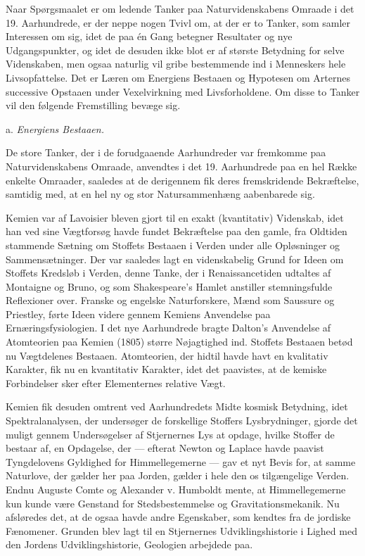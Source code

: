 \documentclass[12pt,a4paper,openany]{book}
\newcommand{\opage}[1]{\marginnote{\footnotesize\textit{[#1]}}}
\newcommand{\sectionhead}[2]{\par\bigskip\phantomsection\begin{center}#1 \textit{#2}\end{center}\addcontentsline{toc}{section}{#1 #2}\medskip\ignorespaces}
\begin{document}
Naar Spørgsmaalet er om ledende Tanker paa Naturvidenskabens
Omraade i det 19. Aarhundrede, er der neppe nogen Tvivl om, at
der er to Tanker, som samler Interessen om sig, idet de paa én
Gang betegner Resultater og nye Udgangspunkter, og idet de desuden
ikke blot er af største Betydning for selve Videnskaben, men
\opage{26}ogsaa naturlig vil gribe bestemmende ind i Menneskers hele Livsopfattelse.
Det er Læren om Energiens Bestaaen og Hypotesen om
Arternes successive Opstaaen under Vexelvirkning med Livsforholdene.
Om disse to Tanker vil den følgende Fremstilling bevæge sig.

\sectionhead{a.}{Energiens Bestaaen.}

De store Tanker, der i de forudgaaende Aarhundreder var fremkomme
paa Naturvidenskabens Omraade, anvendtes i det 19. Aarhundrede
paa en hel Række enkelte Omraader, saaledes at de derigennem
fik deres fremskridende Bekræftelse, samtidig med, at en
hel ny og stor Natursammenhæng aabenbarede sig.

Kemien var af Lavoisier bleven gjort til en exakt (kvantitativ)
Videnskab, idet han ved sine Vægtforsøg havde fundet Bekræftelse
paa den gamle, fra Oldtiden stammende Sætning om Stoffets Bestaaen
i Verden under alle Opløsninger og Sammensætninger. Der
var saaledes lagt en videnskabelig Grund for Ideen om Stoffets Kredsløb
i Verden, denne Tanke, der i Renaissancetiden udtaltes af Montaigne
og Bruno, og som Shakespeare’s Hamlet anstiller stemningsfulde
Reflexioner over. Franske og engelske Naturforskere, Mænd
som Saussure og Priestley, førte Ideen videre gennem Kemiens Anvendelse
paa Ernæringsfysiologien. I det nye Aarhundrede bragte
Dalton’s Anvendelse af Atomteorien paa Kemien (1805) større Nøjagtighed
ind. Stoffets Bestaaen betød nu Vægtdelenes Bestaaen.
Atomteorien, der hidtil havde havt en kvalitativ Karakter, fik nu en
kvantitativ Karakter, idet det paavistes, at de kemiske Forbindelser
sker efter Elementernes relative Vægt.

Kemien fik desuden omtrent ved Aarhundredets Midte kosmisk
Betydning, idet Spektralanalysen, der undersøger de forskellige Stoffers
Lysbrydninger, gjorde det muligt gennem Undersøgelser af Stjernernes
Lys at opdage, hvilke Stoffer de bestaar af, en Opdagelse, der
--- efterat Newton og Laplace havde paavist Tyngdelovens Gyldighed
for Himmellegemerne --- gav et nyt Bevis for, at samme Naturlove,
der gælder her paa Jorden, gælder i hele den os tilgængelige Verden.
Endnu Auguste Comte og Alexander v. Humboldt mente, at Himmellegemerne
kun kunde være Genstand for Stedsbestemmelse og
Gravitationsmekanik. Nu afsløredes det, at de ogsaa havde andre
Egenskaber, som kendtes fra de jordiske Fænomener. Grunden blev
lagt til en Stjernernes Udviklingshistorie i Lighed med den Jordens
Udviklingshistorie, Geologien arbejdede paa.
\end{document}
